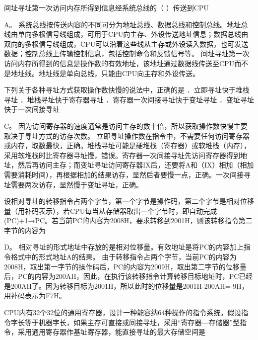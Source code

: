 \question 间址寻址第一次访问内存所得到信息经系统总线的（ ）传送到CPU
\par{}
\begin{solution}A。
系统总线按传送内容的不同可分为地址总线、数据总线和控制总线。地址总线由单向多根信号线组成，可用于CPU向主存、外设传送地址信息；数据总线由双向的多根信号线组成，CPU可以沿着这些线从主存或外设读入数据，也可发送数据；控制总线上传输控制信息，包括控制命令和反馈信号等。
间址寻址第一次访问内存所得到的信息是操作数的有效地址，该地址通过数据线传送至CPU而不是地址线。地址线是单向总线，只能由CPU向主存和外设传送。
\end{solution}
\question 下列关于各种寻址方式获取操作数快慢的说法中，正确的是
．立即寻址快于堆栈寻址 ．堆栈寻址快于寄存器寻址
．寄存器一次间接寻址快于变址寻址 ．变址寻址快于一次间接寻址
\par{}
\begin{solution}C。
因为访问寄存器的速度通常是访问主存的数十倍，所以获取操作数快慢主要取决于寻址方式的访存次数。
立即寻址操作数在指令中，不需要任何访问寄存器或内存，取数最快，正确。堆栈寻址可能是硬堆栈（寄存器）或软堆栈（内存），采用软堆栈时比寄存器寻址慢，错误。寄存器一次间接寻址先访问寄存器得到地址，然后再访问主存；而变址寻址访问寄存器IX后，还要将A和（IX）相加（相加需要消耗时间），再根据相加的结果访存，显然后者要慢一点，正确。一次间接寻址需要两次访存，显然慢于变址寻址，正确。
\end{solution}
\question 设相对寻址的转移指令占两个字节，第一个字节是操作码，第二个字节是相对位移量（用补码表示），若CPU每当从存储器取出一个字节时，即自动完成(PC)+1→PC。若当前PC的内容为2008H，要求转移到2001H，则该转移指令第二字节的内容为
\par{}
\begin{solution}D。
相对寻址的形式地址中存放的是相对位移量。有效地址是将PC的内容加上指令格式中的形式地址A的结果。
由于转移指令占两个字节，当前PC的内容为2008H，取出第一字节的操作码后，PC的内容为2009H，取出第二字节的位移量后，PC的内容为200AH，因此，在执行该转移指令计算转移目标地址时，PC已经是200AH了。因为转移目标为2001H，所以此时的位移量是2001H-200AH=-9H，用补码表示为F7H。
\end{solution}
\question CPU内有32个32位的通用寄存器，设计一种能容纳64种操作的指令系统。假设指令字长等于机器字长，如果主存可直接或间接寻址，采用``寄存器---存储器''型指令，采用通用寄存器作基址寄存器，能直接寻址的最大存储空间是
